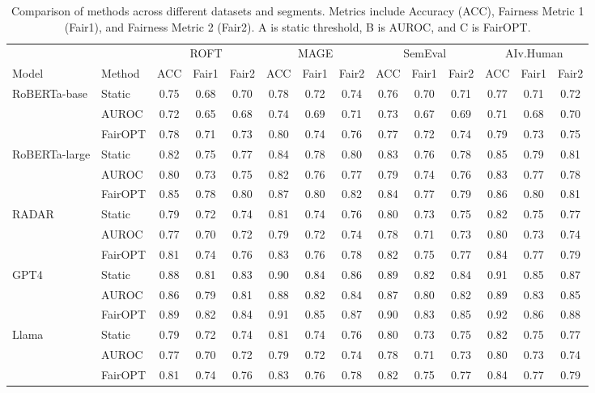 \begin{table*}[!t]
    \centering
    \begin{tabular}{l|l|ccc|ccc|ccc|ccc}
        \hline
        & & \multicolumn{3}{c|}{ROFT} & \multicolumn{3}{c|}{MAGE} & \multicolumn{3}{c|}{SemEval} & \multicolumn{3}{c}{AIv.Human} \\
        Model & Method & ACC & Fair1 & Fair2 & ACC & Fair1 & Fair2 & ACC & Fair1 & Fair2 & ACC & Fair1 & Fair2 \\
        \hline
        RoBERTa-base & Static & 0.75 & 0.68 & 0.70 & 0.78 & 0.72 & 0.74 & 0.76 & 0.70 & 0.71 & 0.77 & 0.71 & 0.72 \\
           & AUROC   & 0.72 & 0.65 & 0.68 & 0.74 & 0.69 & 0.71 & 0.73 & 0.67 & 0.69 & 0.71 & 0.68 & 0.70 \\
           & FairOPT    & 0.78 & 0.71 & 0.73 & 0.80 & 0.74 & 0.76 & 0.77 & 0.72 & 0.74 & 0.79 & 0.73 & 0.75 \\
        \hline
        RoBERTa-large & Static & 0.82 & 0.75 & 0.77 & 0.84 & 0.78 & 0.80 & 0.83 & 0.76 & 0.78 & 0.85 & 0.79 & 0.81 \\
           & AUROC   & 0.80 & 0.73 & 0.75 & 0.82 & 0.76 & 0.77 & 0.79 & 0.74 & 0.76 & 0.83 & 0.77 & 0.78 \\
           & FairOPT    & 0.85 & 0.78 & 0.80 & 0.87 & 0.80 & 0.82 & 0.84 & 0.77 & 0.79 & 0.86 & 0.80 & 0.81 \\
        \hline
        RADAR & Static & 0.79 & 0.72 & 0.74 & 0.81 & 0.74 & 0.76 & 0.80 & 0.73 & 0.75 & 0.82 & 0.75 & 0.77 \\
           & AUROC   & 0.77 & 0.70 & 0.72 & 0.79 & 0.72 & 0.74 & 0.78 & 0.71 & 0.73 & 0.80 & 0.73 & 0.74 \\
           & FairOPT   & 0.81 & 0.74 & 0.76 & 0.83 & 0.76 & 0.78 & 0.82 & 0.75 & 0.77 & 0.84 & 0.77 & 0.79 \\
        \hline
         GPT4 & Static & 0.88 & 0.81 & 0.83 & 0.90 & 0.84 & 0.86 & 0.89 & 0.82 & 0.84 & 0.91 & 0.85 & 0.87 \\
           & AUROC   & 0.86 & 0.79 & 0.81 & 0.88 & 0.82 & 0.84 & 0.87 & 0.80 & 0.82 & 0.89 & 0.83 & 0.85 \\
           & FairOPT    & 0.89 & 0.82 & 0.84 & 0.91 & 0.85 & 0.87 & 0.90 & 0.83 & 0.85 & 0.92 & 0.86 & 0.88 \\
        \hline
        Llama & Static & 0.79 & 0.72 & 0.74 & 0.81 & 0.74 & 0.76 & 0.80 & 0.73 & 0.75 & 0.82 & 0.75 & 0.77 \\
           & AUROC   & 0.77 & 0.70 & 0.72 & 0.79 & 0.72 & 0.74 & 0.78 & 0.71 & 0.73 & 0.80 & 0.73 & 0.74 \\
           & FairOPT    & 0.81 & 0.74 & 0.76 & 0.83 & 0.76 & 0.78 & 0.82 & 0.75 & 0.77 & 0.84 & 0.77 & 0.79 \\
        \hline
    \end{tabular}
    \caption{Comparison of methods across different datasets and segments. Metrics include Accuracy (ACC), Fairness Metric 1 (Fair1), and Fairness Metric 2 (Fair2). A is static threshold, B is AUROC, and C is FairOPT.}
    \label{tab:comparison_table}
\end{table*}